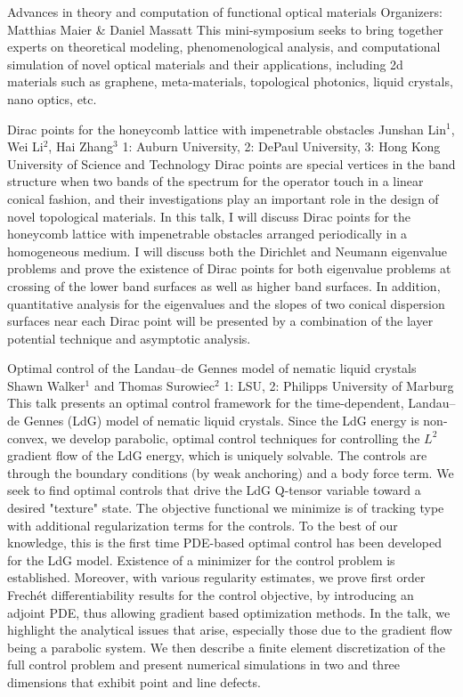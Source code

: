 \label{mini18}

\miniabs
{Advances in theory and computation of functional optical materials}
{Organizers: Matthias Maier \& Daniel Massatt}
{This mini-symposium seeks to bring together experts on theoretical modeling, phenomenological analysis, and computational simulation of novel optical materials and their applications, including 2d materials such as graphene, meta-materials, topological photonics, liquid crystals, nano optics, etc.}

\begin{addmargin}[2em]{0em}
\vspace{2ex}
\abs
{Dirac points for the honeycomb lattice with impenetrable obstacles}
{Junshan Lin$^{1}$, Wei Li$^{2}$, Hai Zhang$^{3}$}
{1: Auburn University, 2: DePaul University, 3: Hong Kong University of Science and Technology}
{Dirac points are special vertices in the band structure when two bands of the spectrum for the operator touch in a linear conical fashion, and their investigations play an important role in the design of novel topological materials. In this talk, I will discuss Dirac points for the honeycomb lattice with impenetrable obstacles arranged periodically in a homogeneous medium. I will discuss both the Dirichlet and Neumann eigenvalue problems and prove the existence of Dirac points for both eigenvalue problems at crossing of the lower band surfaces as well as higher band surfaces. In addition, quantitative analysis for the eigenvalues and the slopes of two conical dispersion surfaces near each Dirac point will be presented by a combination of the layer potential technique and asymptotic analysis.}


\vspace{1.5ex}
\abs
{Optimal control of the Landau--de Gennes model of nematic liquid crystals}
{Shawn Walker$^{1}$ and Thomas Surowiec$^{2}$}
{1: LSU, 2: Philipps University of Marburg}
{This talk presents an optimal control framework for the time-dependent, Landau--de Gennes (LdG) model of nematic liquid crystals.  Since the LdG energy is non-convex, we develop parabolic, optimal control techniques for controlling the $L^2$ gradient flow of the LdG energy, which is uniquely solvable.  The controls are through the boundary conditions (by weak anchoring) and a body force term. We seek to find optimal controls that drive the LdG Q-tensor variable toward a desired "texture" state.  The objective functional we minimize is of tracking type with additional regularization terms for the controls.  To the best of our knowledge, this is the first time PDE-based optimal control has been developed for the LdG model. Existence of a minimizer for the control problem is established.  Moreover, with various regularity estimates, we prove first order Frech\'{e}t differentiability results for the control objective, by introducing an adjoint PDE, thus allowing gradient based optimization methods.  In the talk, we highlight the analytical issues that arise, especially those due to the gradient flow being a parabolic system.  We then describe a finite element discretization of the full control problem and present numerical simulations in two and three dimensions that exhibit point and line defects.}



\end{addmargin}
